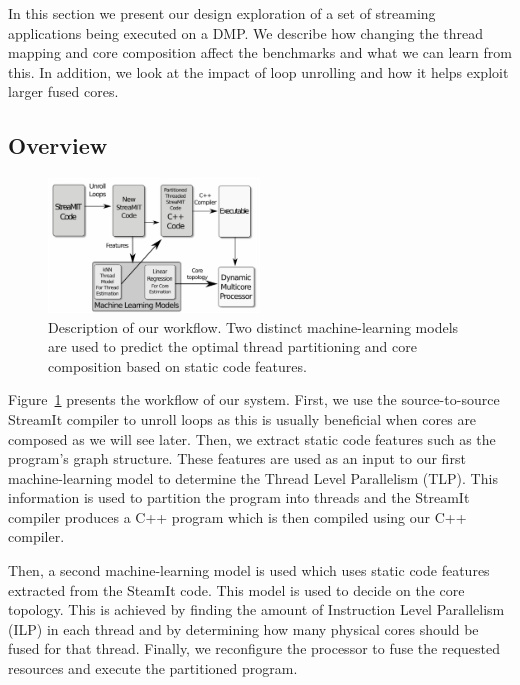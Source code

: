 In this section we present our design exploration of a set of streaming applications being executed on a DMP.
We describe how changing the thread mapping and core composition affect the benchmarks and what we can learn from this.
In addition, we look at the impact of loop unrolling and how it helps exploit larger fused cores.

\subsection{Overview}

\begin{figure}[t]
    \centering
    \includegraphics[width=0.5\textwidth]{streamit-paper/graphics/explanation.pdf}
    \caption{Description of our workflow.
    Two distinct machine-learning models are used to predict the optimal thread partitioning and core composition based on static code features.}
\vspace{-5mm}
    \label{fig:overview}
\end{figure}

Figure~\ref{fig:overview} presents the workflow of our system.
First, we use the source-to-source StreamIt compiler to unroll loops as this is usually beneficial when cores are composed as we will see later.
Then, we extract static code features such as the program's graph structure.
These features are used as an input to our first machine-learning model to determine the Thread Level Parallelism (TLP).
This information is used to partition the program into threads and the StreamIt compiler produces a C++ program which  is then compiled using our C++ compiler.

Then, a second machine-learning model is used which uses static code features extracted from the SteamIt code.
This model is used to decide on the core topology.
This is achieved by finding the amount of Instruction Level Parallelism (ILP) in each thread and by determining how many physical cores should be fused for that thread.
Finally, we reconfigure the processor to fuse the requested resources and execute the partitioned program.


